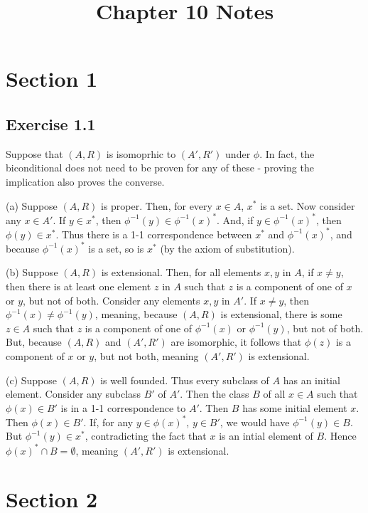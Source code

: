 \documentclass{article}
\title{Chapter 10 Notes}
\theoremstyle{definition}
\begin{document}
\date{}
\maketitle

\section*{Section 1}

\subsection*{Exercise 1.1}
Suppose that $(A,R)$ is isomoprhic to $(A',R')$ under $\phi$.
In fact, the biconditional does not need to be proven for any of these - proving the
implication also proves the converse.

(a) Suppose $(A,R)$ is proper. Then, for every $x\in A$, $x^*$ is a set. Now consider any 
$x\in A'$. If $y\in x^*$, then $\phi^{-1}(y)\in \phi^{-1}(x)^*$. And, if 
$y\in\phi^{-1}(x)^*$, then $\phi(y)\in x^*$. Thus there is a 1-1 correspondence between 
$x^*$ and $\phi^{-1}(x)^*$, and because $\phi^{-1}(x)^*$ is a set, so is 
$x^*$ (by the axiom of substitution).

(b) Suppose $(A,R)$ is extensional. Then, for all elements $x,y$ in $A$, if 
$x\ne y$, then there is at least one element $z$ in $A$ such that $z$ is a component of 
one of $x$ or $y$, but not of both. Consider any elements $x,y$ in $A'$. If $x\ne y$, 
then $\phi^{-1}(x)\ne\phi^{-1}(y)$, meaning, because $(A,R)$ is extensional, there is some 
$z\in A$ such that $z$ is a component of one of $\phi^{-1}(x)$ or $\phi^{-1}(y)$, but not of 
both. But, because $(A,R)$ and $(A',R')$ are isomorphic, it follows that $\phi(z)$ is a component of 
$x$ or $y$, but not both, meaning $(A',R')$ is extensional.

(c) Suppose $(A,R)$ is well founded. Thus every subclass of $A$ has an initial element. 
Consider any subclass $B'$ of $A'$. Then the class $B$ of all 
$x\in A$ such that $\phi(x)\in B'$ is in a 1-1 correspondence to $A'$. Then 
$B$ has some initial element $x$. Then $\phi(x)\in B'$. If, for any 
$y\in\phi(x)^*$, $y\in B'$, we would have $\phi^{-1}(y)\in B$. But 
$\phi^{-1}(y)\in x^*$, contradicting the fact that $x$ is an intial element of 
$B$. Hence $\phi(x)^*\cap B=\emptyset$, meaning $(A',R')$ is extensional.

\section*{Section 2}
\end{document}
